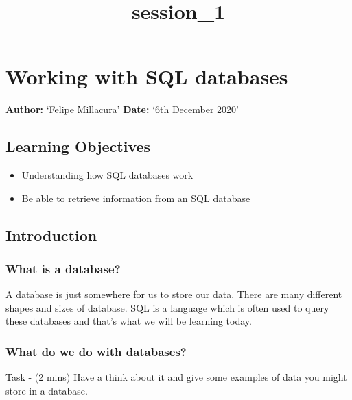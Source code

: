 \documentclass[11pt]{article}
\title{session\_1}
\providecommand{\tightlist}{%
      \setlength{\itemsep}{0pt}\setlength{\parskip}{0pt}}
\begin{document}
    
    \maketitle
    
    

    
    \hypertarget{working-with-sql-databases}{%
\section{Working with SQL databases}\label{working-with-sql-databases}}

\textbf{Author:} `Felipe Millacura' \textbf{Date:} `6th December 2020'

\hypertarget{learning-objectives}{%
\subsection{Learning Objectives}\label{learning-objectives}}

\begin{itemize}
\tightlist
\item
  Understanding how SQL databases work
\item
  Be able to retrieve information from an SQL database
\end{itemize}

\hypertarget{introduction}{%
\subsection{Introduction}\label{introduction}}

\hypertarget{what-is-a-database}{%
\subsubsection{What is a database?}\label{what-is-a-database}}

A database is just somewhere for us to store our data. There are many
different shapes and sizes of database. SQL is a language which is often
used to query these databases and that's what we will be learning today.

\hypertarget{what-do-we-do-with-databases}{%
\subsubsection{What do we do with
databases?}\label{what-do-we-do-with-databases}}

Task - (2 mins) Have a think about it and give some examples of data you
might store in a database.
\end{document}
